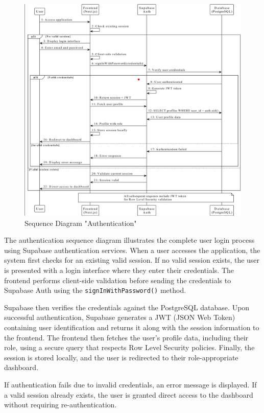 \begin{figure}[H]
    \centering
    \includegraphics[width=0.95\linewidth]{img/chap_03/sequence_authentication.png}
    \caption{Sequence Diagram "Authentication"}
    \label{fig:sequence_authentication}
\end{figure}

The authentication sequence diagram illustrates the complete user login process using Supabase authentication services. When a user accesses the application, the system first checks for an existing valid session. If no valid session exists, the user is presented with a login interface where they enter their credentials. The frontend performs client-side validation before sending the credentials to Supabase Auth using the \texttt{signInWithPassword()} method.

Supabase then verifies the credentials against the PostgreSQL database. Upon successful authentication, Supabase generates a JWT (JSON Web Token) containing user identification and returns it along with the session information to the frontend. The frontend then fetches the user's profile data, including their role, using a secure query that respects Row Level Security policies. Finally, the session is stored locally, and the user is redirected to their role-appropriate dashboard.

If authentication fails due to invalid credentials, an error message is displayed. If a valid session already exists, the user is granted direct access to the dashboard without requiring re-authentication.

